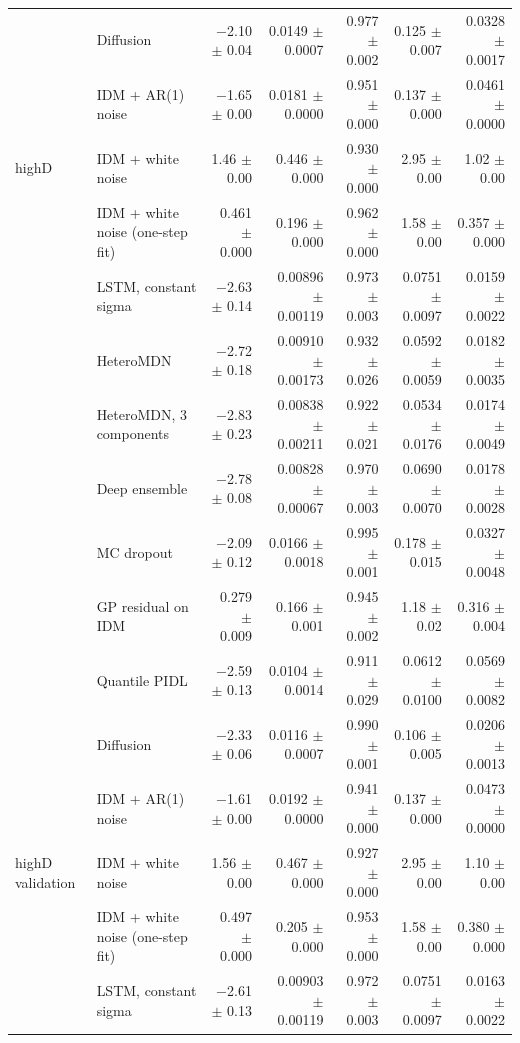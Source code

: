 \begin{longtable}{llrrrrr}
 & Diffusion & $-$2.10 $\pm$ 0.04 & 0.0149 $\pm$ 0.0007 & 0.977 $\pm$ 0.002 & 0.125 $\pm$ 0.007 & 0.0328 $\pm$ 0.0017 \\
 & IDM + AR(1) noise & $-$1.65 $\pm$ 0.00 & 0.0181 $\pm$ 0.0000 & 0.951 $\pm$ 0.000 & 0.137 $\pm$ 0.000 & 0.0461 $\pm$ 0.0000 \\
\midrule
highD & IDM + white noise & 1.46 $\pm$ 0.00 & 0.446 $\pm$ 0.000 & 0.930 $\pm$ 0.000 & 2.95 $\pm$ 0.00 & 1.02 $\pm$ 0.00 \\
 & IDM + white noise (one-step fit) & 0.461 $\pm$ 0.000 & 0.196 $\pm$ 0.000 & 0.962 $\pm$ 0.000 & 1.58 $\pm$ 0.00 & 0.357 $\pm$ 0.000 \\
 & LSTM, constant sigma & $-$2.63 $\pm$ 0.14 & 0.00896 $\pm$ 0.00119 & 0.973 $\pm$ 0.003 & 0.0751 $\pm$ 0.0097 & 0.0159 $\pm$ 0.0022 \\
 & HeteroMDN & $-$2.72 $\pm$ 0.18 & 0.00910 $\pm$ 0.00173 & 0.932 $\pm$ 0.026 & 0.0592 $\pm$ 0.0059 & 0.0182 $\pm$ 0.0035 \\
 & HeteroMDN, 3 components & $-$2.83 $\pm$ 0.23 & 0.00838 $\pm$ 0.00211 & 0.922 $\pm$ 0.021 & 0.0534 $\pm$ 0.0176 & 0.0174 $\pm$ 0.0049 \\
 & Deep ensemble & $-$2.78 $\pm$ 0.08 & 0.00828 $\pm$ 0.00067 & 0.970 $\pm$ 0.003 & 0.0690 $\pm$ 0.0070 & 0.0178 $\pm$ 0.0028 \\
 & MC dropout & $-$2.09 $\pm$ 0.12 & 0.0166 $\pm$ 0.0018 & 0.995 $\pm$ 0.001 & 0.178 $\pm$ 0.015 & 0.0327 $\pm$ 0.0048 \\
 & GP residual on IDM & 0.279 $\pm$ 0.009 & 0.166 $\pm$ 0.001 & 0.945 $\pm$ 0.002 & 1.18 $\pm$ 0.02 & 0.316 $\pm$ 0.004 \\
 & Quantile PIDL & $-$2.59 $\pm$ 0.13 & 0.0104 $\pm$ 0.0014 & 0.911 $\pm$ 0.029 & 0.0612 $\pm$ 0.0100 & 0.0569 $\pm$ 0.0082 \\
 & Diffusion & $-$2.33 $\pm$ 0.06 & 0.0116 $\pm$ 0.0007 & 0.990 $\pm$ 0.001 & 0.106 $\pm$ 0.005 & 0.0206 $\pm$ 0.0013 \\
 & IDM + AR(1) noise & $-$1.61 $\pm$ 0.00 & 0.0192 $\pm$ 0.0000 & 0.941 $\pm$ 0.000 & 0.137 $\pm$ 0.000 & 0.0473 $\pm$ 0.0000 \\
\midrule
highD validation & IDM + white noise & 1.56 $\pm$ 0.00 & 0.467 $\pm$ 0.000 & 0.927 $\pm$ 0.000 & 2.95 $\pm$ 0.00 & 1.10 $\pm$ 0.00 \\
 & IDM + white noise (one-step fit) & 0.497 $\pm$ 0.000 & 0.205 $\pm$ 0.000 & 0.953 $\pm$ 0.000 & 1.58 $\pm$ 0.00 & 0.380 $\pm$ 0.000 \\
 & LSTM, constant sigma & $-$2.61 $\pm$ 0.13 & 0.00903 $\pm$ 0.00119 & 0.972 $\pm$ 0.003 & 0.0751 $\pm$ 0.0097 & 0.0163 $\pm$ 0.0022 \\

\end{longtable}

